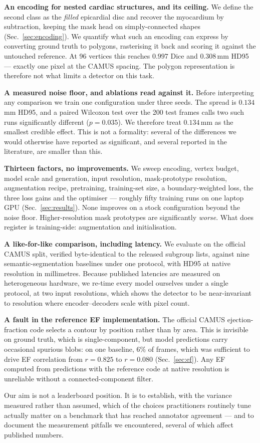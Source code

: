 \textbf{An encoding for nested cardiac structures, and its ceiling.} We define
the second class as the \emph{filled} epicardial disc and recover the myocardium
by subtraction, keeping the mask head on simply-connected shapes
(Sec.~\ref{sec:encoding}). We quantify what such an encoding can express by
converting ground truth to polygons, rasterising it back and scoring it against
the untouched reference. At 96 vertices this reaches $0.997$ Dice and
$0.308$\,mm HD95 --- exactly one pixel at the CAMUS spacing. The polygon
representation is therefore not what limits a detector on this task.

\textbf{A measured noise floor, and ablations read against it.} Before
interpreting any comparison we train one configuration under three seeds. The
spread is $0.134$\,mm HD95, and a paired Wilcoxon test over the 200 test frames
calls two such runs significantly different ($p{=}0.035$). We therefore treat
$0.134$\,mm as the smallest credible effect. This is not a formality: several of
the differences we would otherwise have reported as significant, and several
reported in the literature, are smaller than this.

\textbf{Thirteen factors, no improvements.} We sweep encoding, vertex budget,
model scale and generation, input resolution, mask-prototype resolution,
augmentation recipe, pretraining, training-set size, a boundary-weighted loss,
the three loss gains and the optimiser --- roughly fifty training runs on one
laptop GPU (Sec.~\ref{sec:results}). None improves on a stock configuration
beyond the noise floor. Higher-resolution mask prototypes are significantly
\emph{worse}. What does register is training-side: augmentation and
initialisation.

\textbf{A like-for-like comparison, including latency.} We evaluate on the
official CAMUS split, verified byte-identical to the released subgroup lists,
against nine semantic-segmentation baselines under one protocol, with HD95 at
native resolution in millimetres. Because published latencies are measured on
heterogeneous hardware, we re-time every model ourselves under a single
protocol, at two input resolutions, which shows the detector to be
near-invariant to resolution where encoder--decoders scale with pixel count.

\textbf{A fault in the reference EF implementation.} The official CAMUS
ejection-fraction code selects a contour by position rather than by area. This
is invisible on ground truth, which is single-component, but model predictions
carry occasional spurious blobs: on one baseline, $6\%$ of frames, which was
sufficient to drive EF correlation from $r{=}0.825$ to $r{=}0.080$
(Sec.~\ref{sec:ef}). Any EF computed from predictions with the reference code at
native resolution is unreliable without a connected-component filter.

Our aim is not a leaderboard position. It is to establish, with the variance
measured rather than assumed, which of the choices practitioners routinely tune
actually matter on a benchmark that has reached annotator agreement --- and to
document the measurement pitfalls we encountered, several of which affect
published numbers.
